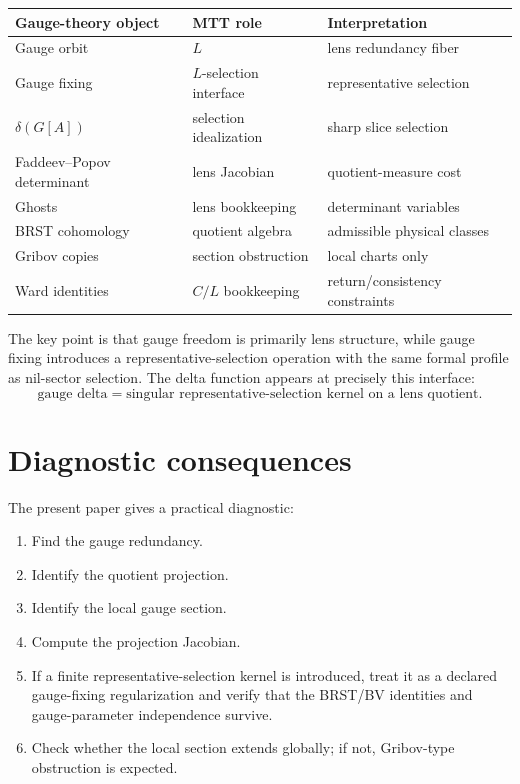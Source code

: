 \documentclass[11pt]{article}
\begin{document}
\begin{center}
\begin{tabular}{p{}p{}p{}}
\hline
Gauge-theory object & MTT role & Interpretation\\
\hline
Gauge orbit & \(L\) & lens redundancy fiber\\
Gauge fixing & \(L\)-selection interface & representative selection\\
\(\delta(G[A])\) & selection idealization & sharp slice selection\\
Faddeev--Popov determinant & lens Jacobian & quotient-measure cost\\
Ghosts & lens bookkeeping & determinant variables\\
BRST cohomology & quotient algebra & admissible physical classes\\
Gribov copies & section obstruction & local charts only\\
Ward identities & \(C/L\) bookkeeping & return/consistency constraints\\
\hline
\end{tabular}
\end{center}

The key point is that gauge freedom is primarily lens structure, while gauge fixing introduces a representative-selection operation with the same formal profile as nil-sector selection. The delta function appears at precisely this interface:
\[
\boxed{
\text{gauge delta}=\text{singular representative-selection kernel on a lens quotient}.
}
\]

\section{Diagnostic consequences}

The present paper gives a practical diagnostic:

\begin{enumerate}
\item Find the gauge redundancy.
\item Identify the quotient projection.
\item Identify the local gauge section.
\item Compute the projection Jacobian.
\item If a finite representative-selection kernel is introduced, treat it
as a declared gauge-fixing regularization and verify that the BRST/BV
identities and gauge-parameter independence survive.
\item Check whether the local section extends globally; if not, Gribov-type obstruction is expected.
\end{enumerate}
\end{document}
